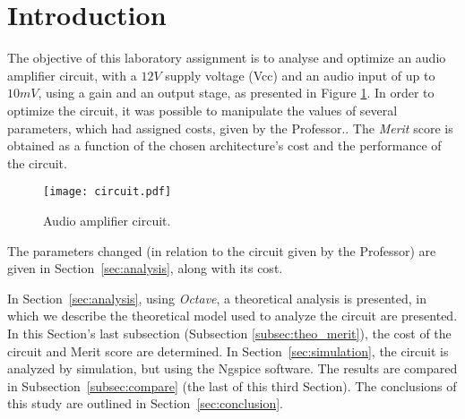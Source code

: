 \section{Introduction}
\label{sec:introduction}

The objective of this laboratory assignment is to analyse and optimize an audio amplifier circuit, with a $12V$ supply voltage (Vcc) and an audio input of up to $10mV$, using a gain and an output stage, as presented in Figure  \ref{fig:circuit}. In order to optimize the circuit, it was possible to manipulate the values of several parameters, which had assigned costs, given by the Professor.. The \textit{Merit} score is obtained as a function of the chosen architecture's cost and the performance of the circuit. 


\begin{figure}[h] \centering
\texttt{[image: circuit.pdf]}
\caption{Audio amplifier circuit.}
\label{fig:circuit}
\end{figure}

The parameters changed (in relation to the circuit given by the Professor) are given in Section~\ref{sec:analysis}, along with its cost.


In Section~\ref{sec:analysis}, using \textit{Octave}, a theoretical analysis is presented, in which we describe the theoretical model used to analyze the circuit are presented. In this Section's last subsection (Subsection \ref{subsec:theo_merit}), the cost of the circuit and Merit score are determined. In Section~\ref{sec:simulation}, the circuit is analyzed by simulation, but using the Ngspice software. The results are compared in Subsection~\ref{subsec:compare} (the last of this third Section). The conclusions of this study are outlined in Section~\ref{sec:conclusion}.